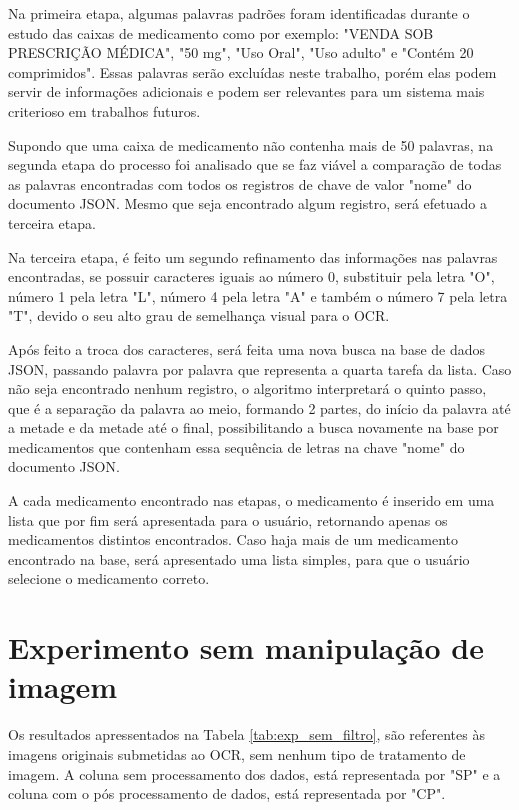 Na primeira etapa, algumas palavras padrões foram identificadas durante o estudo das caixas de medicamento como por exemplo: "VENDA SOB PRESCRIÇÃO MÉDICA", "50 mg", "Uso Oral", "Uso adulto" e "Contém 20 comprimidos". Essas palavras serão excluídas neste trabalho, porém elas podem servir de informações adicionais e podem ser relevantes para um sistema mais criterioso em trabalhos futuros.

Supondo que uma caixa de medicamento não contenha mais de 50 palavras, na segunda etapa do processo foi analisado que se faz viável a comparação de todas as palavras encontradas com todos os registros de chave de valor "nome" do documento JSON. Mesmo que seja encontrado algum registro, será efetuado a terceira etapa.

Na terceira etapa, é feito um segundo refinamento das informações nas palavras encontradas, se possuir caracteres iguais ao número 0, substituir pela letra "O", número 1 pela letra "L", número 4 pela letra "A" e também o número 7 pela letra "T", devido o seu alto grau de semelhança visual para o OCR. 

Após feito a troca dos caracteres, será feita uma nova busca na base de dados JSON, passando palavra por palavra que representa a quarta tarefa da lista. Caso não seja encontrado nenhum registro, o algoritmo %
interpretará o quinto passo, que é a separação da palavra ao meio, formando 2 partes, do início da palavra até a metade e da metade até o final, possibilitando a busca novamente na base por medicamentos que contenham essa sequência de letras na chave "nome" do documento JSON.

A cada medicamento encontrado nas etapas, o medicamento é inserido em uma lista que por fim será apresentada para o usuário, retornando apenas os medicamentos distintos encontrados. Caso haja mais de um medicamento encontrado na base, será apresentado uma lista simples, para que o usuário selecione o medicamento correto.


\section{Experimento sem manipulação de imagem}
Os resultados apressentados na Tabela \ref{tab:exp_sem_filtro}, são referentes às imagens originais submetidas ao OCR, sem nenhum tipo de tratamento de imagem. A coluna sem processamento dos dados, está representada por "SP" e a coluna com o pós processamento de dados, está representada por "CP".


